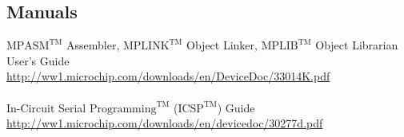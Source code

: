 \documentclass[12pt, letterpaper]{article}
\begin{document}
\subsection{Manuals}
$\text{MPASM}^{\text{TM}}$ Assembler, $\text{MPLINK}^{\text{TM}}$ Object Linker, $\text{MPLIB}^{\text{TM}}$ Object Librarian User's Guide\\
\url{http://ww1.microchip.com/downloads/en/DeviceDoc/33014K.pdf}\\
\\
\noindent In-Circuit Serial $\text{Programming}^{\text{TM}}$ ($\text{ICSP}^{\text{TM}}$) Guide\\
\url{http://ww1.microchip.com/downloads/en/devicedoc/30277d.pdf}
\end{document}
